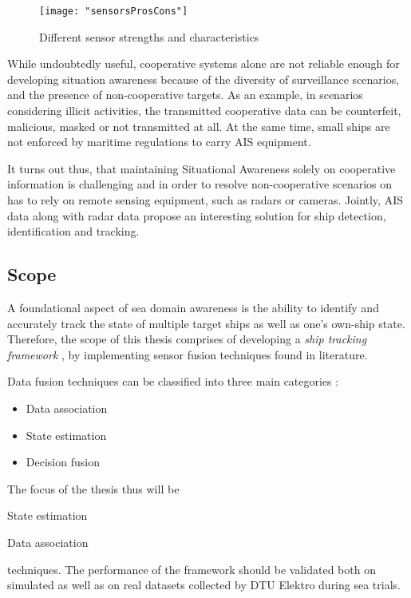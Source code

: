 \begin{figure}[H]
	\centering
	\texttt{[image: "sensorsProsCons"]}
	\caption{Different sensor strengths and characteristics}
	\label{fig:SensorProsCons}
\end{figure}



While undoubtedly useful, cooperative systems alone are not reliable enough for developing situation awareness because of the diversity of surveillance scenarios, and the presence of non-cooperative targets. As an example, in scenarios considering illicit activities, the transmitted cooperative data can be counterfeit, malicious, masked or not transmitted at all. At the same time, small ships are not enforced by maritime regulations to carry AIS equipment. 

It turns out thus, that maintaining Situational Awareness solely on cooperative information is challenging and in order to resolve non-cooperative scenarios on has to rely on remote sensing equipment, such as radars or cameras. Jointly, AIS data along with radar data propose an interesting solution for ship detection, identification and tracking.


\subsection{Scope}


A foundational aspect of sea domain awareness is the ability to identify and accurately track the state of multiple target ships as well as one's own-ship state. Therefore, the scope of this thesis comprises of developing a \emph{ship tracking framework} , by implementing sensor fusion techniques found in literature.

Data fusion techniques can be classified into three main categories  \cite{nedo2013}:
\begin{itemize}
	\item Data association
	\item State estimation
	\item Decision fusion
\end{itemize}

 The focus of the thesis thus will be \begin{mylist}
	\item State estimation
	\item Data association
\end{mylist}
techniques. The performance of the framework should be validated both on simulated as well as on real datasets collected by DTU Elektro during sea trials.

